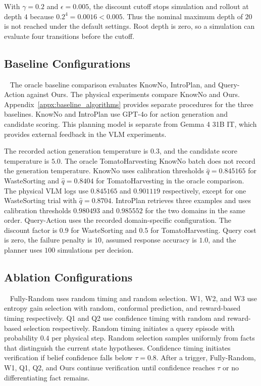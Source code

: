 With $\gamma=0.2$ and $\epsilon=0.005$, the discount cutoff stops simulation and rollout at depth $4$ because $0.2^4=0.0016<0.005$. Thus the nominal maximum depth of $20$ is not reached under the default settings. Root depth is zero, so a simulation can evaluate four transitions before the cutoff.

\subsection{Baseline Configurations}~\label{appx:baseline_configs}
The oracle baseline comparison evaluates KnowNo, IntroPlan, and Query-Action against Ours. The physical experiments compare KnowNo and Ours. Appendix~\ref{appx:baseline_algorithms} provides separate procedures for the three baselines. KnowNo and IntroPlan use GPT-4o for action generation and candidate scoring. This planning model is separate from Gemma 4 31B IT, which provides external feedback in the VLM experiments.

The recorded action generation temperature is $0.3$, and the candidate score temperature is $5.0$. The oracle TomatoHarvesting KnowNo batch does not record the generation temperature. KnowNo uses calibration thresholds $\hat{q}=0.845165$ for WasteSorting and $\hat{q}=0.8404$ for TomatoHarvesting in the oracle comparison. The physical VLM logs use $0.845165$ and $0.901119$ respectively, except for one WasteSorting trial with $\hat{q}=0.8704$. IntroPlan retrieves three examples and uses calibration thresholds $0.980493$ and $0.985552$ for the two domains in the same order. Query-Action uses the recorded domain-specific configuration. The discount factor is $0.9$ for WasteSorting and $0.5$ for TomatoHarvesting. Query cost is zero, the failure penalty is $10$, assumed response accuracy is $1.0$, and the planner uses $100$ simulations per decision.

\subsection{Ablation Configurations}~\label{appx:ablation_configs}
Fully-Random uses random timing and random selection. W1, W2, and W3 use entropy gain selection with random, conformal prediction, and reward-based timing respectively. Q1 and Q2 use confidence timing with random and reward-based selection respectively. Random timing initiates a query episode with probability $0.4$ per physical step. Random selection samples uniformly from facts that distinguish the current state hypotheses. Confidence timing initiates verification if belief confidence falls below $\tau=0.8$. After a trigger, Fully-Random, W1, Q1, Q2, and Ours continue verification until confidence reaches $\tau$ or no differentiating fact remains.


